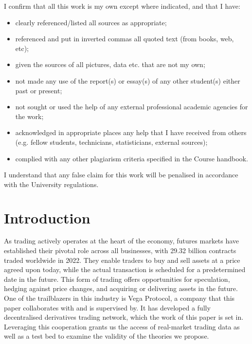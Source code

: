 \documentclass[11pt,twoside]{article}
\numberwithin{Theorem}{section}
\numberwithin{Definition}{section}
\numberwithin{Lemma}{section}
\numberwithin{Algorithm}{section}
\numberwithin{equation}{section}
\begin{document}
\noindent I confirm that all this work is my own except where indicated, and that I have:
\begin{itemize}
    \item clearly referenced/listed all sources as appropriate;
    \item referenced and put in inverted commas all quoted text (from books, web, etc);
    \item given the sources of all pictures, data etc. that are not my own;
    \item not made any use of the report(s) or essay(s) of any other student(s) either past or present;
    \item not sought or used the help of any external professional academic agencies for the work;
    \item acknowledged in appropriate places any help that I have received from others (e.g. fellow students, technicians, statisticians, external sources);
    \item complied with any other plagiarism criteria specified in the Course handbook.
\end{itemize}
I understand that any false claim for this work will be penalised in accordance with the University regulations.
\cleardoublepage



\pagestyle{plain}
\setcounter{page}{1}

\tableofcontents
\clearpage
\listoftables
\listoffigures
\cleardoublepage

\setcounter{page}{1}

\nocite{*}

\clearpage

\section{Introduction}
\label{sec.intro}

As trading actively operates at the heart of the economy, futures markets have established their pivotal role across all businesses, with 29.32 billion contracts traded worldwide in 2022. They enable traders to buy and sell assets at a price agreed upon today, while the actual transaction is scheduled for a predetermined date in the future. This form of trading offers opportunities for speculation, hedging against price changes, and acquiring or delivering assets in the future. One of the trailblazers in this industry is Vega Protocol, a company that this paper collaborates with and is supervised by. It has developed a fully decentralised derivatives trading network, which the work of this paper is set in. Leveraging this cooperation grants us the access of real-market trading data as well as a test bed to examine the validity of the theories we propose.
\end{document}
